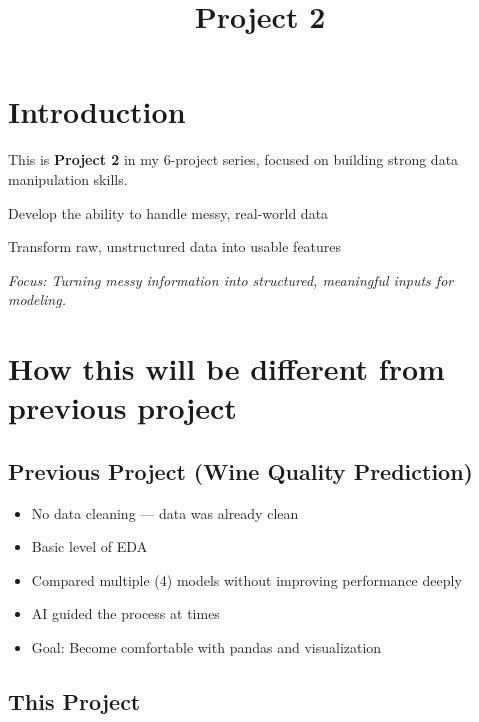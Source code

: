 \documentclass{article}
\title{Project 2}
\begin{document}
\maketitle

\section{Introduction}

\noindent This is \textbf{Project 2} in my 6-project series, focused on building strong data manipulation skills.

\vspace{0.5em}

\begin{description}[leftmargin=2.5cm, style=nextline]
    \item[\textbf{Goal}] Develop the ability to handle messy, real-world data
    \item[\textbf{Core Skill}] Transform raw, unstructured data into usable features
\end{description}

\vspace{0.5em}

\noindent \textit{Focus: Turning messy information into structured, meaningful inputs for modeling.}
\section{How this will be different from previous project}

\subsection*{Previous Project (Wine Quality Prediction)}

\begin{itemize}[leftmargin=*]
    \item No data cleaning — data was already clean
    \item Basic level of EDA
    \item Compared multiple (4) models without improving performance deeply
    \item AI guided the process at times
    \item Goal: Become comfortable with pandas and visualization
\end{itemize}

\vspace{1em}

\subsection*{This Project}
\end{document}
